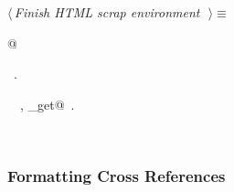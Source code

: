 \documentclass{report}
\begin{document}
\begin{flushleft} \small
\begin{minipage}{\linewidth} \label{scrap106}
$\langle\,${\it Finish HTML scrap environment}\nobreak\ {\footnotesize {}}$\,\rangle\equiv$
\vspace{-1ex}
\begin{list}{}{} \item
\mbox{}@{\NWsep}
\end{list}
\vspace{-1ex}
\footnotesize\addtolength{\baselineskip}{-1ex}
\begin{list}{}{\setlength{\itemsep}{-\parsep}\setlength{\itemindent}{-\leftmargin}}
\item \NWtxtMacroRefIn\ .
\end{list}
\vspace{-2ex}
\footnotesize\addtolength{\baselineskip}{-1ex}
\begin{list}{}{\setlength{\itemsep}{-\parsep}\setlength{\itemindent}{-\leftmargin}}
\item \NWtxtIdentsUsed\nobreak\  \verb@fputs@\nobreak\ , \verb@source_get@\nobreak\ .\end{list}
\end{minipage}\\[4ex]
\end{flushleft}
\subsubsection{Formatting Cross References}
\end{document}
